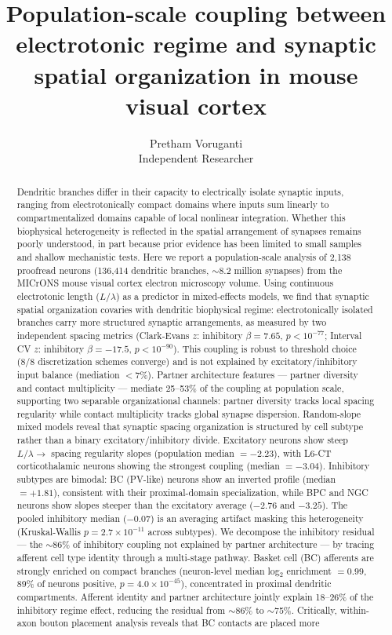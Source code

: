 \documentclass[11pt]{article}
\title{Population-scale coupling between electrotonic regime and synaptic spatial organization in mouse visual cortex}
\author{Pretham Voruganti\\
\small Independent Researcher}
\date{}
\begin{document}
\maketitle

\begin{abstract}
Dendritic branches differ in their capacity to electrically isolate synaptic inputs, ranging from electrotonically compact domains where inputs sum linearly to compartmentalized domains capable of local nonlinear integration. Whether this biophysical heterogeneity is reflected in the spatial arrangement of synapses remains poorly understood, in part because prior evidence has been limited to small samples and shallow mechanistic tests. Here we report a population-scale analysis of 2,138 proofread neurons (136,414 dendritic branches, $\sim$8.2 million synapses) from the MICrONS mouse visual cortex electron microscopy volume. Using continuous electrotonic length ($L/\lambda$) as a predictor in mixed-effects models, we find that synaptic spatial organization covaries with dendritic biophysical regime: electrotonically isolated branches carry more structured synaptic arrangements, as measured by two independent spacing metrics (Clark-Evans $z$: inhibitory $\beta = 7.65$, $p < 10^{-77}$; Interval CV $z$: inhibitory $\beta = -17.5$, $p < 10^{-90}$). This coupling is robust to threshold choice (8/8 discretization schemes converge) and is not explained by excitatory/inhibitory input balance (mediation $<7\%$). Partner architecture features --- partner diversity and contact multiplicity --- mediate 25--53\% of the coupling at population scale, supporting two separable organizational channels: partner diversity tracks local spacing regularity while contact multiplicity tracks global synapse dispersion. Random-slope mixed models reveal that synaptic spacing organization is structured by cell subtype rather than a binary excitatory/inhibitory divide. Excitatory neurons show steep $L/\lambda \to$ spacing regularity slopes (population median $= -2.23$), with L6-CT corticothalamic neurons showing the strongest coupling (median $= -3.04$). Inhibitory subtypes are bimodal: BC (PV-like) neurons show an inverted profile (median $= +1.81$), consistent with their proximal-domain specialization, while BPC and NGC neurons show slopes steeper than the excitatory average ($-2.76$ and $-3.25$). The pooled inhibitory median ($-0.07$) is an averaging artifact masking this heterogeneity (Kruskal-Wallis $p = 2.7 \times 10^{-11}$ across subtypes). We decompose the inhibitory residual --- the $\sim$86\% of inhibitory coupling not explained by partner architecture --- by tracing afferent cell type identity through a multi-stage pathway. Basket cell (BC) afferents are strongly enriched on compact branches (neuron-level median log$_2$ enrichment $= 0.99$, 89\% of neurons positive, $p = 4.0 \times 10^{-45}$), concentrated in proximal dendritic compartments. Afferent identity and partner architecture jointly explain 18--26\% of the inhibitory regime effect, reducing the residual from $\sim$86\% to $\sim$75\%. Critically, within-axon bouton placement analysis reveals that BC contacts are placed more 
\end{abstract}
\end{document}
